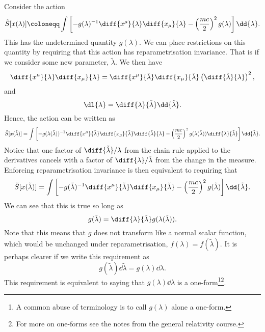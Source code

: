 \documentclass[fleqn]{NotesClass}
\begin{document}
    Consider the action
    \begin{equation}
        \tilde{S}[x(\lambda)] \coloneqq \int \left[ -g(\lambda)^{-1} \diff{x^\mu}{\lambda} \diff{x_\mu}{\lambda} - \left( \frac{mc}{2} \right)^2 g(\lambda) \right] \dd{\lambda}.
    \end{equation}
    This has the undetermined quantity \(g(\lambda)\).
    We can place restrictions on this quantity by requiring that this action has reparametrisation invariance.
    That is if we consider some new parameter, \(\tilde{\lambda}\).
    We then have
    \begin{equation}
        \diff{x^\mu}{\lambda} \diff{x_\mu}{\lambda} = \diff{x^\mu}{\tilde{\lambda}} \diff{x_\mu}{\tilde{\lambda}} \left( \diff{\tilde{\lambda}}{\lambda} \right)^2,
    \end{equation}
    and
    \begin{equation}
        \dl{\lambda} = \diff{\lambda}{\tilde{\lambda}}\dd{\tilde{\lambda}}.
    \end{equation}
    Hence, the action can be written as
    \begin{equation}
        \tilde{S}[x(\tilde{\lambda})] = \int \left[ -g(\lambda(\tilde{\lambda}))^{-1} \diff{x^\mu}{\tilde{\lambda}} \diff{x_\mu}{\tilde{\lambda}} \diff{\tilde{\lambda}}{\lambda} - \left( \frac{mc}{2} \right)^2 g(\lambda(\tilde{\lambda})) \diff{\lambda}{\tilde{\lambda}} \right] \dd{\tilde{\lambda}}.
    \end{equation}
    Notice that one factor of \(\diff{\tilde{\lambda}}/{\lambda}\) from the chain rule applied to the derivatives cancels with a factor of \(\diff{\lambda}/{\tilde{\lambda}}\) from the change in the measure.
    Enforcing reparametrisation invariance is then equivalent to requiring that
    \begin{equation}
        \tilde{S}[x(\tilde{\lambda})] = \int\left[ -g(\tilde{\lambda})^{-1} \diff{x^\mu}{\tilde{\lambda}} \diff{x_\mu}{\tilde{\lambda}} - \left( \frac{mc}{2} \right)^2 g(\tilde{\lambda}) \right] \dd{\tilde{\lambda}}.
    \end{equation}
    We can see that this is true so long as
    \begin{equation}
        g(\tilde{\lambda}) = \diff{\lambda}{\tilde{\lambda}} g(\lambda(\tilde{\lambda})).
    \end{equation}
    Note that this means that \(g\) does not transform like a normal scalar function, which would be unchanged under reparametrisation, \(f(\lambda) = f(\tilde{\lambda})\).
    It is perhaps clearer if we write this requirement as
    \begin{equation}
        g(\tilde{\lambda})\dd{\tilde{\lambda}} = g(\lambda) \dd{\lambda}.
    \end{equation}
    This requirement is equivalent to saying that \(g(\lambda)\dd{\lambda}\) is a one-form\footnote{A common abuse of terminology is to call \(g(\lambda)\) alone a one-form.}\footnote{For more on one-forms see the notes from the general relativity course.}.
    
\end{document}
